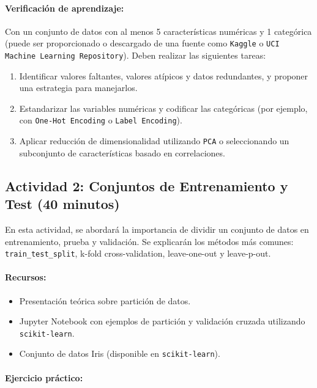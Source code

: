 \documentclass[a4,11pt]{aleph-notas}
\begin{document}
\paragraph{Verificación de aprendizaje:} Con un conjunto de datos con al menos 5 características numéricas y 1 categórica (puede ser proporcionado o descargado de una fuente como \texttt{Kaggle} o \texttt{UCI Machine Learning Repository}). Deben realizar las siguientes tareas:
\begin{enumerate}
    \item Identificar valores faltantes, valores atípicos y datos redundantes, y proponer una estrategia para manejarlos.
    \item Estandarizar las variables numéricas y codificar las categóricas (por ejemplo, con \texttt{One-Hot Encoding} o \texttt{Label Encoding}).
    \item Aplicar reducción de dimensionalidad utilizando \texttt{PCA} o seleccionando un subconjunto de características basado en correlaciones.
\end{enumerate}

\subsection*{Actividad 2: Conjuntos de Entrenamiento y Test (40 minutos)}  

En esta actividad, se abordará la importancia de dividir un conjunto de datos en entrenamiento, prueba y validación. Se explicarán los métodos más comunes: \texttt{train\_test\_split}, k-fold cross-validation, leave-one-out y leave-p-out.



\paragraph{Recursos:} 
\begin{itemize}
    \item Presentación teórica sobre partición de datos.
    \item Jupyter Notebook con ejemplos de partición y validación cruzada utilizando \texttt{scikit-learn}.
    \item Conjunto de datos Iris (disponible en \texttt{scikit-learn}).
\end{itemize}

\paragraph{Ejercicio práctico:}  \hspace{0pt}
\end{document}
